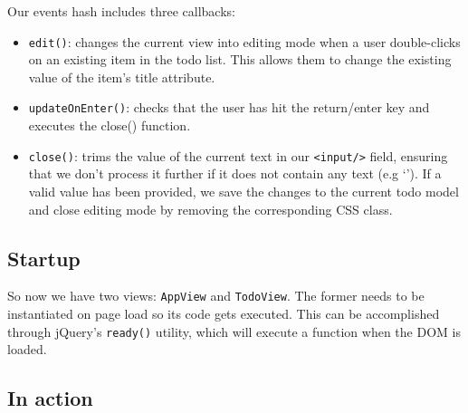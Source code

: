 \documentclass[9pt]{book}
\newenvironment{Shaded}{}{}
\newcommand{\KeywordTok}[1]{\textcolor[rgb]{0.00,0.44,0.13}{\textbf{{#1}}}}
\newcommand{\DecValTok}[1]{\textcolor[rgb]{0.25,0.63,0.44}{{#1}}}
\newcommand{\CommentTok}[1]{\textcolor[rgb]{0.38,0.63,0.69}{\textit{{#1}}}}
\newcommand{\OtherTok}[1]{\textcolor[rgb]{0.00,0.44,0.13}{{#1}}}
\newcommand{\FunctionTok}[1]{\textcolor[rgb]{0.02,0.16,0.49}{{#1}}}
\newcommand{\NormalTok}[1]{{#1}}
\begin{document}
Our events hash includes three callbacks:

\begin{itemize}
\itemsep1pt\parskip0pt
\item
  \texttt{edit()}: changes the current view into editing mode when a
  user double-clicks on an existing item in the todo list. This allows
  them to change the existing value of the item's title attribute.
\item
  \texttt{updateOnEnter()}: checks that the user has hit the
  return/enter key and executes the close() function.
\item
  \texttt{close()}: trims the value of the current text in our
  \texttt{\textless{}input/\textgreater{}} field, ensuring that we don't
  process it further if it does not contain any text (e.g `'). If a
  valid value has been provided, we save the changes to the current todo
  model and close editing mode by removing the corresponding CSS class.
\end{itemize}

\subsection{Startup}\label{startup}

So now we have two views: \texttt{AppView} and \texttt{TodoView}. The
former needs to be instantiated on page load so its code gets executed.
This can be accomplished through jQuery's \texttt{ready()} utility,
which will execute a function when the DOM is loaded.

\begin{Shaded}
\end{Shaded}

\subsection{In action}\label{in-action}
\end{document}
